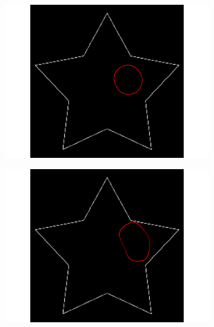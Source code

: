 \begin{appendices}
\begin{figure}[H]
\begin{subfigure}[c]{0.3\linewidth}
\centering
\includegraphics[width=\textwidth]{Chapters/Images/Init/vfcus1}
\caption{}
\end{subfigure}
\begin{subfigure}[c]{0.3\linewidth}
\centering
\includegraphics[width=\textwidth]{Chapters/Images/Init/vfcus2}
\caption{}
\end{subfigure}
\begin{subfigure}[c]{0.3\linewidth}
\centering

\end{subfigure}
\end{figure}
\end{appendices}

